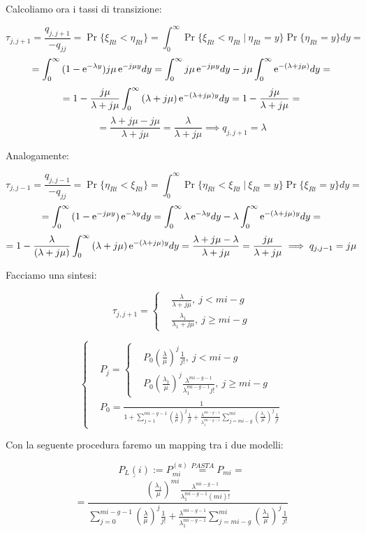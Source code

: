 \begin{itemize}
Calcoliamo ora i tassi di transizione:

\[
	\tau_{j,j+1}=\frac{q_{j,j+1}}{-q_{jj}} = \Pr\{\xi_{Rt}<\eta_{Rt}\} = \int_0^\infty{\Pr\{\xi_{Rt}<\eta_{Rt}\ |\ \eta_{Rt}=y\}\Pr\{\eta_{Rt}=y\}dy} =
\]
\[
	= \int_0^\infty{(1-\mathop{}\!\mathrm{e}^{-\lambda y})j\mu\mathop{}\!\mathrm{e}^{-j\mu y}dy} = \int_0^\infty{j\mu\mathop{}\!\mathrm{e}^{-j\mu y}dy}-j\mu\int_0^\infty{\mathop{}\!\mathrm{e}^{-(\lambda+j\mu)}dy} =
\]
\[
	= 1-\frac{j\mu}{\lambda+j\mu}\int_0^\infty{(\lambda+j\mu)\mathop{}\!\mathrm{e}^{-(\lambda+j\mu)y}dy} = 1-\frac{j\mu}{\lambda+j\mu} =
\]
\[
	= \frac{\lambda+j\mu-j\mu}{\lambda+j\mu} = \frac{\lambda}{\lambda+j\mu} \implies q_{j,j+1}=\lambda
\]

Analogamente:

\[	
	\tau_{j,j-1}=\frac{q_{j,j-1}}{-q_{jj}} = \Pr\{\eta_{Rt}<\xi_{Rt}\} = \int_0^\infty{\Pr\{\eta_{Rt}<\xi_{Rt}\ |\ \xi_{Rt}=y\}\Pr\{\xi_{Rt}=y\}dy} =
\]
\[
	= \int_0^\infty{(1-\mathop{}\!\mathrm{e}^{-j\mu y})\mathop{}\!\mathrm{e}^{-\lambda y}dy} = \int_0^\infty{\lambda\mathop{}\!\mathrm{e}^{-\lambda y}dy}-\lambda\int_0^\infty{\mathop{}\!\mathrm{e}^{-(\lambda+j\mu)y}dy} =
\]
\[
	= 1-\frac{\lambda}{(\lambda+j\mu)}\int_0^\infty{(\lambda+j\mu)\mathop{}\!\mathrm{e}^{-(\lambda+j\mu)y}dy} = \frac{\lambda+j\mu-\lambda}{\lambda+j\mu} = \frac{j\mu}{\lambda+j\mu} \implies q_{j,j-1}=j\mu 
\]

Facciamo una sintesi:

\[
	\tau_{j,j+1} = \left\{
	\begin{aligned}
	&\frac{\lambda}{\lambda+j\mu},\ j<mi-g\\
	&\frac{\lambda_1}{\lambda_1+j\mu},\ j\geq mi-g
	\end{aligned}
	\right.
\]

\[
	\left\{
	\begin{aligned}
	&P_j = \left\{
	\begin{aligned}
	&P_0(\frac{\lambda}{\mu})^j \frac{1}{j!},\ j<mi-g\\
	&P_0(\frac{\lambda_1}{\mu})^j \frac{\lambda^{mi-g-1}}{\lambda_1^{mi-g-1}j!},\ j\geq mi-g
	\end{aligned}
	\right.\\
	&P_0 = \frac{1}{1+\sum_{j=1}^{mi-g-1}{(\frac{\lambda}{\mu})^j \frac{1}{j!}} + \frac{\lambda^{mi-g-1}}{\lambda_1^{mi-g-1}}\sum_{j=mi-g}^{mi}{(\frac{\lambda_1}{\mu})^j \frac{1}{j!}}}
	\end{aligned}
	\right.
\]

\end{itemize}

Con la seguente procedura faremo un mapping tra i due modelli:

\[
	\underline{P_L(i)} := P_{mi}^{(a)} \stackrel{PASTA}{=} P_{mi} =
\]
\[
	= \frac{(\frac{\lambda_1}{\mu})^{mi} \frac{\lambda^{mi-g-1}}{\lambda_1^{mi-g-1} (mi)!}}{\sum_{j=0}^{mi-g-1}{(\frac{\lambda}{\mu})^j \frac{1}{j!}} + \frac{\lambda^{mi-g-1}}{\lambda_1^{mi-g-1}}\sum_{j=mi-g}^{mi}{(\frac{\lambda_1}{\mu})^j \frac{1}{j!}}}
\]

